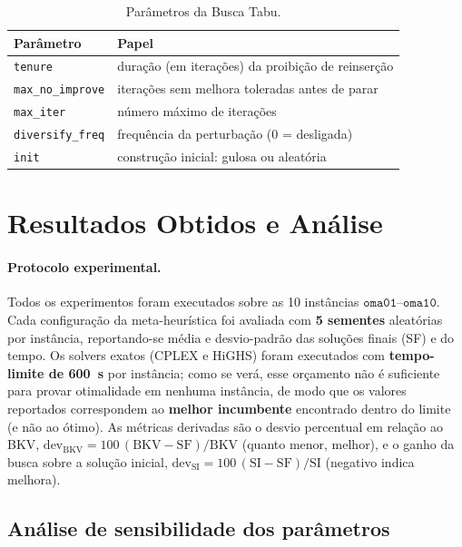 \documentclass[a4paper,11pt]{article}
\begin{document}
\begin{table}[htbp]
  \centering
  \caption{Parâmetros da Busca Tabu.}
  \label{tab:params}
  \begin{tabular}{l l}
    \toprule
    Parâmetro & Papel \\
    \midrule
    \texttt{tenure}          & duração (em iterações) da proibição de reinserção \\
    \texttt{max\_no\_improve} & iterações sem melhora toleradas antes de parar \\
    \texttt{max\_iter}        & número máximo de iterações \\
    \texttt{diversify\_freq}  & frequência da perturbação ($0$ = desligada) \\
    \texttt{init}             & construção inicial: gulosa ou aleatória \\
    \bottomrule
  \end{tabular}
\end{table}

\section{Resultados Obtidos e Análise}
\label{sec:resultados}

\paragraph{Protocolo experimental.}
Todos os experimentos foram executados sobre as 10 instâncias $\texttt{oma01}$--$\texttt{oma10}$. Cada configuração da meta-heurística foi avaliada com \textbf{5 sementes}
aleatórias por instância, reportando-se média e desvio-padrão das soluções finais (SF) e
do tempo. Os solvers exatos (CPLEX e HiGHS) foram executados com \textbf{tempo-limite de
\SI{600}{\second}} por instância; como se verá, esse orçamento não é suficiente para provar
otimalidade em nenhuma instância, de modo que os valores reportados correspondem ao
\textbf{melhor incumbente} encontrado dentro do limite (e não ao ótimo). As métricas
derivadas são o desvio percentual em relação ao BKV, $\text{dev}_{\text{BKV}} =
100\,(\text{BKV}-\text{SF})/\text{BKV}$ (quanto menor, melhor), e o ganho da busca sobre a
solução inicial, $\text{dev}_{\text{SI}} = 100\,(\text{SI}-\text{SF})/\text{SI}$ (negativo
indica melhora).

\subsection{Análise de sensibilidade dos parâmetros}
\label{sec:sens}
\end{document}
